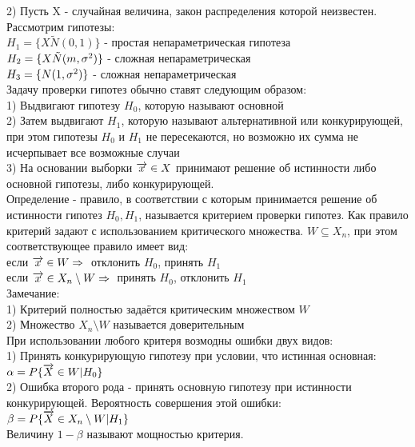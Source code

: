 2) Пусть X - случайная величина, закон распределения которой неизвестен. Рассмотрим гипотезы:\\
$H_1  = \{X \tilde N(0,1)\}$ - простая непараметрическая гипотеза\\
$H_2 = \{X \tilde N(m, \sigma^2)\}$ - сложная непараметрическая\\
$H_3 = \{N(1, \sigma^2)\}$ - сложная непараметрическая\\

Задачу проверки гипотез обычно ставят следующим образом:\\
1) Выдвигают гипотезу $H_0$, которую называют основной\\
2) Затем выдвигают $H_1$, которую называют альтернативной или конкурирующей, при этом гипотезы $H_0$ и $H_1$ не пересекаются, но возможно их сумма не исчерпывает все возможные случаи\\
3) На основании выборки $\overrightarrow{x} \in X$ принимают решение об истинности либо основной гипотезы, либо конкурирующей.\\

Определение - правило, в соответствии с которым принимается решение об истинности гипотез $H_0, H_1$, называется критерием проверки гипотез. Как правило критерий задают с использованием критического множества. $W \subseteq X_n$, при этом соответствующее правило имеет вид:\\
если $\overrightarrow{x} \in W \Rightarrow{}$ отклонить $H_0$, принять $H_1$\\
если $\overrightarrow{x} \in X_n \setminus W \Rightarrow{}$ принять $H_0$, отклонить $H_1$\\

Замечание:\\
1) Критерий полностью задаётся критическим множеством $W$\\
2) Множество $X_n \setminus W$ называется доверительным\\

При использовании любого критеря возмодны ошибки двух видов:\\
1) Принять конкурирующую гипотезу при условии, что истинная основная:\\
$\alpha = P\{\overrightarrow{X} \in W | H_0\}$\\
2) Ошибка второго рода - принять основную гипотезу при истинности конкурирующей. Вероятность совершения этой ошибки:\\
$\beta = P\{\overrightarrow{X} \in X_n \setminus W | H_1\}$\\
Величину $1 - \beta$ называют мощностью критерия.\\

